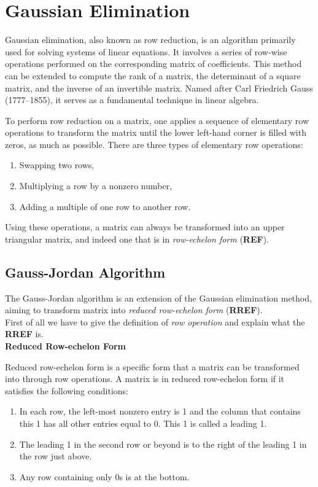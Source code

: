 \section{Gaussian Elimination}
Gaussian elimination, also known as row reduction, is an algorithm primarily used for solving systems of linear equations. It involves a series of row-wise operations performed on the corresponding matrix of coefficients. This method can be extended to compute the rank of a matrix, the determinant of a square matrix, and the inverse of an invertible matrix. Named after Carl Friedrich Gauss (1777–1855), it serves as a fundamental technique in linear algebra.

To perform row reduction on a matrix, one applies a sequence of elementary row operations to transform the matrix until the lower left-hand corner is filled with zeros, as much as possible. There are three types of elementary row operations:

\begin{enumerate}
    \item Swapping two rows,
    \item Multiplying a row by a nonzero number,
    \item Adding a multiple of one row to another row.
\end{enumerate}

Using these operations, a matrix can always be transformed into an upper triangular matrix, and indeed one that is in \textit{row-echelon form} (\textbf{REF}).

\subsection{Gauss-Jordan Algorithm}

The Gauss-Jordan algorithm is an extension of the Gaussian elimination method, aiming to transform matrix into \textit{reduced row-echelon form} (\textbf{RREF}).
\\
First of all we have to give the definition of \textit{row operation} and explain what the \textbf{RREF} is.
\\

\textbf{Reduced Row-echelon Form}

Reduced row-echelon form is a specific form that a matrix can be transformed into through row operations. A matrix is in reduced row-echelon form if it satisfies the following conditions:

\begin{enumerate}
    \item In each row, the left-most nonzero entry is 1 and the column that contains this 1 has all other entries equal to 0. This 1 is called a leading 1.

    \item The leading 1 in the second row or beyond is to the right of the leading 1 in the row just above.

    \item Any row containing only 0s is at the bottom.
\end{enumerate}

